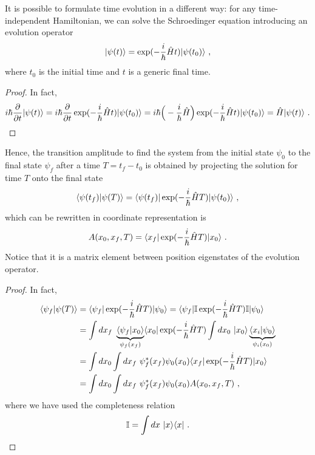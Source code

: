     It is possible to formulate time evolution in a different way: for any time-independent Hamiltonian, we can solve the Schroedinger equation introducing an evolution operator 
    \begin{equation*}
        \vert\psi(t)\rangle = \exp(- \frac{i}{\hbar} \hat H t) \vert\psi (t_0)\rangle ~,
    \end{equation*}
    where $t_0$ is the initial time and $t$ is a generic final time.
    \begin{proof}
        In fact, 
        \begin{equation*}
            i \hbar \frac{\partial}{\partial t} \vert\psi(t)\rangle = i \hbar \frac{\partial}{\partial t} \exp(- \frac{i}{\hbar} \hat H t) \vert\psi (t_0)\rangle = i \hbar \Big ( - \frac{i}{\hbar} \hat H \Big ) \exp(- \frac{i}{\hbar} \hat H t) \vert\psi (t_0)\rangle = \hat H \vert\psi(t)\rangle ~. 
        \end{equation*}
    \end{proof}
    Hence, the transition amplitude to find the system from the initial state $\psi_0$ to the final state $\psi_f$ after a time $T = t_f - t_0$ is obtained by projecting the solution for time $T$ onto the final state 
    \begin{equation*}
        \langle\psi (t_f)\vert\psi(T)\rangle = \langle\psi (t_f)\vert \exp(- \frac{i}{\hbar} \hat H T) \vert\psi (t_0)\rangle ~,
    \end{equation*}
    which can be rewritten in coordinate representation is 
    \begin{equation*}
        A (x_0, x_f, T) = \langle x_f\vert \exp(- \frac{i}{\hbar} \hat H T) \vert x_0\rangle ~.
    \end{equation*}
    Notice that it is a matrix element between position eigenstates of the evolution operator.
    \begin{proof}
        In fact, 
        \begin{equation*}
        \begin{aligned}
            \langle\psi_f\vert\psi(T)\rangle & = \langle\psi_f\vert \exp(- \frac{i}{\hbar} \hat H T) \vert\psi_0\rangle = \langle\psi_f\vert \mathbb I \exp(- \frac{i}{\hbar} \hat H T) \mathbb I \vert\psi_0\rangle \\ & = \int dx_f ~ \underbrace{\langle\psi_f\vert x_0\rangle}_{\psi_f(x_f)} \langle x_0\vert \exp(- \frac{i}{\hbar} \hat H T) \int dx_0 ~ \vert x_0\rangle \underbrace{\langle x_i\vert\psi_0\rangle}_{\psi_i(x_0)} \\ & = \int dx_0 \int dx_f ~ \psi_f^* (x_f) \psi_0 (x_0) \langle x_f\vert \exp(- \frac{i}{\hbar} \hat H T) \vert x_0\rangle \\ & = \int dx_0 \int dx_f ~ \psi_f^* (x_f) \psi_0 (x_0) A (x_0, x_f, T) ~,
        \end{aligned}
        \end{equation*}
        where we have used the completeness relation 
        \begin{equation*}
            \mathbb I = \int dx ~ \vert x\rangle \langle x\vert ~.
        \end{equation*}
    \end{proof}

